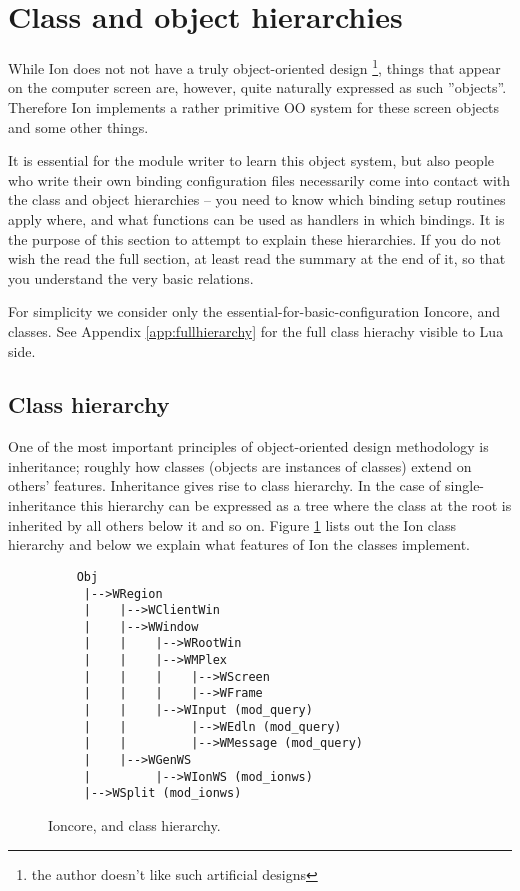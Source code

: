 
\section{Class and object hierarchies}
\label{sec:objects}

While Ion does not not have a truly object-oriented design
\footnote{the author doesn't like such artificial designs},
things that appear on the computer screen are, however, quite
naturally expressed as such ''objects''. Therefore Ion implements
a rather primitive OO system for these screen objects and some
other things. 

It is essential for the module writer to learn this object
system, but also people who write their own binding configuration files
necessarily come into contact with the class and object hierarchies
-- you need to know which binding setup routines apply where, 
and what functions can be used as handlers in which bindings.
It is the purpose of this section to attempt to explain these 
hierarchies. If you do not wish the read the full section, at least
read the summary at the end of it, so that you understand the very
basic relations.

For simplicity we consider only the essential-for-basic-configuration
Ioncore,  and  classes. 
See Appendix \ref{app:fullhierarchy} for the full class hierachy visible
to Lua side.

\subsection{Class hierarchy}

One of the most important principles of object-oriented design methodology
is inheritance; roughly how classes (objects are instances of classes)
extend on others' features. Inheritance gives rise to class hierarchy.
In the case of single-inheritance this hierarchy can be expressed as a
tree where the class at the root is inherited by all others below it
and so on. Figure \ref{fig:classhierarchy} lists out the Ion class 
hierarchy and below we explain what features of Ion the classes 
implement.

\begin{figure}
\begin{htmlonly}
\docode %
\end{htmlonly}
\begin{verbatim}
    Obj
     |-->WRegion
     |    |-->WClientWin
     |    |-->WWindow
     |    |    |-->WRootWin
     |    |    |-->WMPlex
     |    |    |    |-->WScreen
     |    |    |    |-->WFrame
     |    |    |-->WInput (mod_query)
     |    |         |-->WEdln (mod_query)
     |    |         |-->WMessage (mod_query)
     |    |-->WGenWS
     |         |-->WIonWS (mod_ionws)
     |-->WSplit (mod_ionws)
\end{verbatim}
\caption{Ioncore,  and  class hierarchy.}
\label{fig:classhierarchy}
\end{figure}

